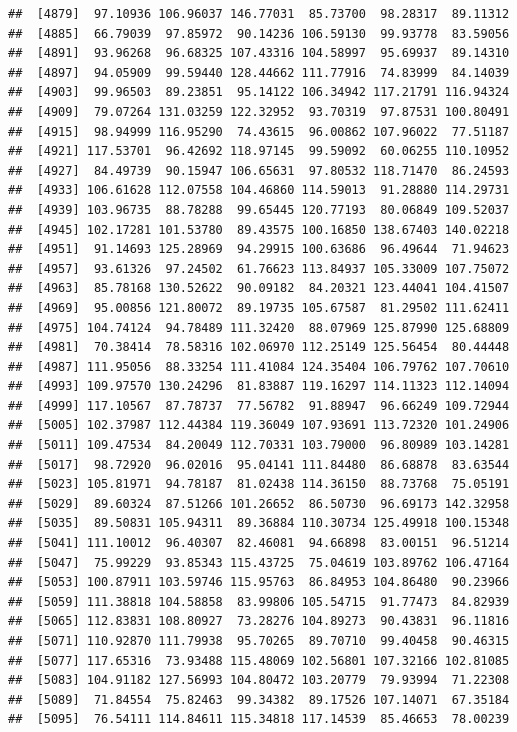 \documentclass[
]{article}
\begin{document}
\begin{verbatim}
##  [4879]  97.10936 106.96037 146.77031  85.73700  98.28317  89.11312
##  [4885]  66.79039  97.85972  90.14236 106.59130  99.93778  83.59056
##  [4891]  93.96268  96.68325 107.43316 104.58997  95.69937  89.14310
##  [4897]  94.05909  99.59440 128.44662 111.77916  74.83999  84.14039
##  [4903]  99.96503  89.23851  95.14122 106.34942 117.21791 116.94324
##  [4909]  79.07264 131.03259 122.32952  93.70319  97.87531 100.80491
##  [4915]  98.94999 116.95290  74.43615  96.00862 107.96022  77.51187
##  [4921] 117.53701  96.42692 118.97145  99.59092  60.06255 110.10952
##  [4927]  84.49739  90.15947 106.65631  97.80532 118.71470  86.24593
##  [4933] 106.61628 112.07558 104.46860 114.59013  91.28880 114.29731
##  [4939] 103.96735  88.78288  99.65445 120.77193  80.06849 109.52037
##  [4945] 102.17281 101.53780  89.43575 100.16850 138.67403 140.02218
##  [4951]  91.14693 125.28969  94.29915 100.63686  96.49644  71.94623
##  [4957]  93.61326  97.24502  61.76623 113.84937 105.33009 107.75072
##  [4963]  85.78168 130.52622  90.09182  84.20321 123.44041 104.41507
##  [4969]  95.00856 121.80072  89.19735 105.67587  81.29502 111.62411
##  [4975] 104.74124  94.78489 111.32420  88.07969 125.87990 125.68809
##  [4981]  70.38414  78.58316 102.06970 112.25149 125.56454  80.44448
##  [4987] 111.95056  88.33254 111.41084 124.35404 106.79762 107.70610
##  [4993] 109.97570 130.24296  81.83887 119.16297 114.11323 112.14094
##  [4999] 117.10567  87.78737  77.56782  91.88947  96.66249 109.72944
##  [5005] 102.37987 112.44384 119.36049 107.93691 113.72320 101.24906
##  [5011] 109.47534  84.20049 112.70331 103.79000  96.80989 103.14281
##  [5017]  98.72920  96.02016  95.04141 111.84480  86.68878  83.63544
##  [5023] 105.81971  94.78187  81.02438 114.36150  88.73768  75.05191
##  [5029]  89.60324  87.51266 101.26652  86.50730  96.69173 142.32958
##  [5035]  89.50831 105.94311  89.36884 110.30734 125.49918 100.15348
##  [5041] 111.10012  96.40307  82.46081  94.66898  83.00151  96.51214
##  [5047]  75.99229  93.85343 115.43725  75.04619 103.89762 106.47164
##  [5053] 100.87911 103.59746 115.95763  86.84953 104.86480  90.23966
##  [5059] 111.38818 104.58858  83.99806 105.54715  91.77473  84.82939
##  [5065] 112.83831 108.80927  73.28276 104.89273  90.43831  96.11816
##  [5071] 110.92870 111.79938  95.70265  89.70710  99.40458  90.46315
##  [5077] 117.65316  73.93488 115.48069 102.56801 107.32166 102.81085
##  [5083] 104.91182 127.56993 104.80472 103.20779  79.93994  71.22308
##  [5089]  71.84554  75.82463  99.34382  89.17526 107.14071  67.35184
##  [5095]  76.54111 114.84611 115.34818 117.14539  85.46653  78.00239

\end{verbatim}
\end{document}
